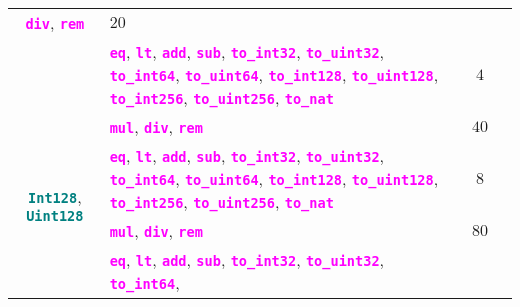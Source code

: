 \documentclass[9pt]{article}
\begin{document}
\begin{table}[!hbt]
\begin{tabular}{|c|p{4.1cm}|c|p{5cm}|}
		 \textbf{\texttt{\textcolor{magenta}{div}}},
		 \textbf{\texttt{\textcolor{magenta}{rem}}} &
		 $ 20 $  & \\ \cline{2-4}
		 & 
		 \textbf{\texttt{\textcolor{magenta}{eq}}},
		 \textbf{\texttt{\textcolor{magenta}{lt}}},
		 \textbf{\texttt{\textcolor{magenta}{add}}},
		 \textbf{\texttt{\textcolor{magenta}{sub}}},
		 \textbf{\texttt{\textcolor{magenta}{to\_int32}}},
		 \textbf{\texttt{\textcolor{magenta}{to\_uint32}}},
		 \textbf{\texttt{\textcolor{magenta}{to\_int64}}},
		 \textbf{\texttt{\textcolor{magenta}{to\_uint64}}},
		 \textbf{\texttt{\textcolor{magenta}{to\_int128}}},
		 \textbf{\texttt{\textcolor{magenta}{to\_uint128}}},
		 \textbf{\texttt{\textcolor{magenta}{to\_int256}}},
		 \textbf{\texttt{\textcolor{magenta}{to\_uint256}}},
		 \textbf{\texttt{\textcolor{magenta}{to\_nat}}}
		 & $4$  & \\ \hline \hline
		\multirow{4}{*}{\textbf{\texttt{\textcolor{teal}{Int128}}},
		\textbf{\texttt{\textcolor{teal}{Uint128}}}} &
		\textbf{\texttt{\textcolor{magenta}{mul}}},
		 \textbf{\texttt{\textcolor{magenta}{div}}},
		 \textbf{\texttt{\textcolor{magenta}{rem}}} &
		 $ 40 $  & \\ \cline{2-4}
		 & 
		 \textbf{\texttt{\textcolor{magenta}{eq}}},
		 \textbf{\texttt{\textcolor{magenta}{lt}}},
		 \textbf{\texttt{\textcolor{magenta}{add}}},
		 \textbf{\texttt{\textcolor{magenta}{sub}}},
		 \textbf{\texttt{\textcolor{magenta}{to\_int32}}},
		 \textbf{\texttt{\textcolor{magenta}{to\_uint32}}},
		 \textbf{\texttt{\textcolor{magenta}{to\_int64}}},
		 \textbf{\texttt{\textcolor{magenta}{to\_uint64}}},
		 \textbf{\texttt{\textcolor{magenta}{to\_int128}}},
		 \textbf{\texttt{\textcolor{magenta}{to\_uint128}}},
		 \textbf{\texttt{\textcolor{magenta}{to\_int256}}},
		 \textbf{\texttt{\textcolor{magenta}{to\_uint256}}},
		 \textbf{\texttt{\textcolor{magenta}{to\_nat}}}
		 & $8$  & \\ \hline \hline
		\multirow{4}{*}{\textbf{\texttt{\textcolor{teal}{Int256}}},
		\textbf{\texttt{\textcolor{teal}{Uint256}}}} &
		\textbf{\texttt{\textcolor{magenta}{mul}}},
		 \textbf{\texttt{\textcolor{magenta}{div}}},
		 \textbf{\texttt{\textcolor{magenta}{rem}}} &
		 $ 80 $  & \\ \cline{2-4}
		 &
		 \textbf{\texttt{\textcolor{magenta}{eq}}},
		 \textbf{\texttt{\textcolor{magenta}{lt}}},
		 \textbf{\texttt{\textcolor{magenta}{add}}},
		 \textbf{\texttt{\textcolor{magenta}{sub}}},
		 \textbf{\texttt{\textcolor{magenta}{to\_int32}}},
		 \textbf{\texttt{\textcolor{magenta}{to\_uint32}}},
		 \textbf{\texttt{\textcolor{magenta}{to\_int64}}},

\end{tabular}
\end{table}
\end{document}
